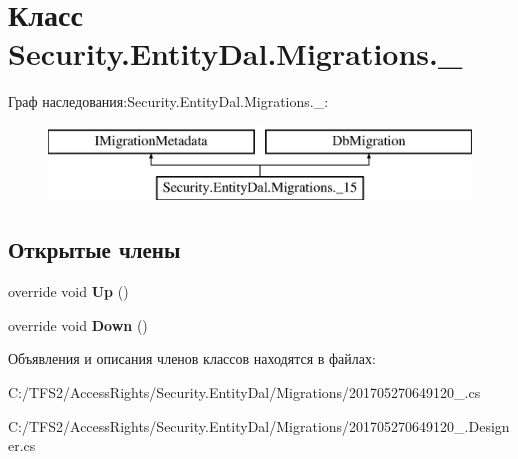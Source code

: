 \hypertarget{class_security_1_1_entity_dal_1_1_migrations_1_1__15}{}\section{Класс Security.\+Entity\+Dal.\+Migrations.\+\_}
\label{class_security_1_1_entity_dal_1_1_migrations_1_1__15}
Граф наследования\+:Security.\+Entity\+Dal.\+Migrations.\+\_\+:\begin{figure}[H]
\begin{center}
\leavevmode
\includegraphics[height=2.000000cm]{da/dda/class_security_1_1_entity_dal_1_1_migrations_1_1__15}
\end{center}
\end{figure}
\subsection*{Открытые члены}
\begin{DoxyCompactItemize}
\item 
\mbox{\label{class_security_1_1_entity_dal_1_1_migrations_1_1__15_ab4528db8fa41d1a610b20dac8792a8b3}} 
override void {\bfseries Up} ()
\item 
\mbox{\label{class_security_1_1_entity_dal_1_1_migrations_1_1__15_a19a7ddedf0c015a100cf695005225525}} 
override void {\bfseries Down} ()
\end{DoxyCompactItemize}


Объявления и описания членов классов находятся в файлах\+:\begin{DoxyCompactItemize}
\item 
C\+:/\+T\+F\+S2/\+Access\+Rights/\+Security.\+Entity\+Dal/\+Migrations/201705270649120\+\_.\+cs\item 
C\+:/\+T\+F\+S2/\+Access\+Rights/\+Security.\+Entity\+Dal/\+Migrations/201705270649120\+\_.\+Designer.\+cs\end{DoxyCompactItemize}

